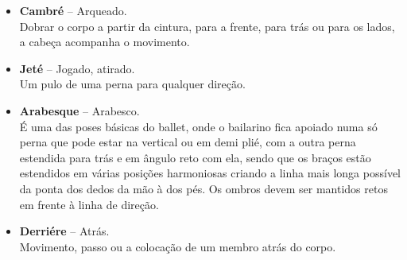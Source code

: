 \begin{itemize}
\item\textbf{Cambré} – Arqueado.\\
Dobrar o corpo a partir da cintura, para a frente, para trás ou para os
lados, a cabeça acompanha o movimento.

\item\textbf{Jeté} – Jogado, atirado.\\
Um pulo de uma perna para qualquer direção.

\item\textbf{Arabesque} – Arabesco.\\
É uma das poses básicas do ballet, onde o bailarino fica apoiado numa só
perna que pode estar na vertical ou em demi plié, com a outra perna
estendida para trás e em ângulo reto com ela, sendo que os braços estão
estendidos em várias posições harmoniosas criando a linha mais longa
possível da ponta dos dedos da mão à dos pés. Os ombros devem ser
mantidos retos em frente à linha de direção.

\item\textbf{Derriére} – Atrás.\\
Movimento, passo ou a colocação de um membro atrás do corpo.
\end{itemize}

